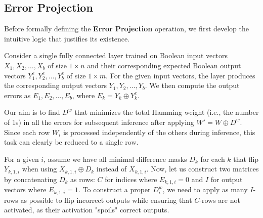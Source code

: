 \documentclass{article}
\theoremstyle{definition}
\theoremstyle{remark}
\begin{document}
\subsection{Error Projection}
Before formally defining the \textbf{Error Projection} operation, we first develop the intuitive logic that justifies its existence.

Consider a single fully connected layer trained on Boolean input vectors \( X_1, X_2, \dots, X_b \) of size \( 1 \times n \) and their corresponding expected Boolean output vectors \( Y^e_1, Y^e_2, \dots, Y^e_b \) of size \( 1 \times m \). For the given input vectors, the layer produces the corresponding output vectors \( Y_1, Y_2, \dots, Y_b \). We then compute the output errors as \( E_1, E_2, \dots, E_b \), where \( E_k = Y_k \oplus Y^e_k \).

Our aim is to find \( D^w \) that minimizes the total Hamming weight (i.e., the number of 1s) in all the errors for subsequent inference after applying \( W' = W \oplus D^w \). Since each row \( W_i \) is processed independently of the others during inference, this task can clearly be reduced to a single row.

For a given \( i \), assume we have all minimal difference masks \( D_k \) for each \( k \) that flip \( Y_{k,1,i} \) when using \( X_{k,1,i} \oplus D_k \) instead of \( X_{k,1,i} \). Now, let us construct two matrices by concatenating \( D_k \) as rows: \( C \) for indices where \( E_{k,1,i} = 0 \) and \( I \) for output vectors where \( E_{k,1,i} = 1 \). To construct a proper \( D^w_i \), we need to apply as many \( I \)-rows as possible to flip incorrect outputs while ensuring that \( C \)-rows are not activated, as their activation "spoils" correct outputs.
\end{document}
